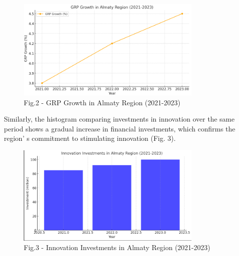\begin{figure}[H]
	\centering
	\includegraphics[width=0.8\textwidth]{media/ekon/image4}
	\caption*{Fig.2 - GRP Growth in Almaty Region (2021-2023)}
\end{figure}

Similarly, the histogram comparing investments in innovation over the
same period shows a gradual increase in financial investments, which
confirms the region' s commitment to stimulating
innovation (Fig. 3).

\begin{figure}[H]
	\centering
	\includegraphics[width=0.8\textwidth]{media/ekon/image5}
	\caption*{Fig.3 - Innovation Investments in Almaty Region (2021-2023)}
\end{figure}

